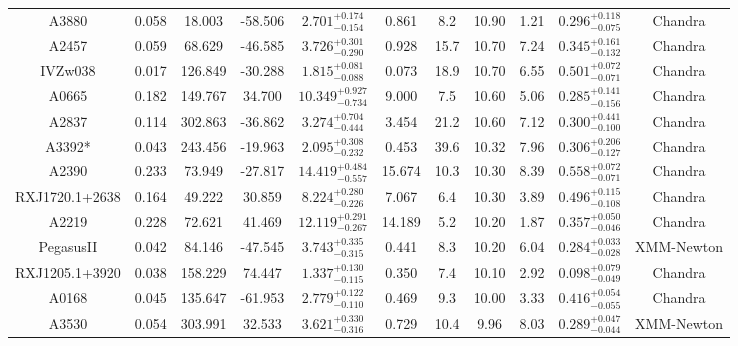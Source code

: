 \documentclass{aa}   %
\begin{document}
\begin{table}[h!]
\begin{center}
\begin{tabular}{ c  c  c  c c c c c c c c }
A3880               		&		0.058	&	18.003	&	-58.506	& $	2.701^{+0.174}_{-0.154}$  &      0.861	&  8.2	&	10.90	&	1.21	&	$ 0.296^{+0.118}_{-0.075}  $ &	  Chandra     \\
A2457               		&		0.059	&	68.629	&	-46.585	& $	3.726^{+0.301}_{-0.290}$  &      0.928	&  15.7	&	10.70	&	7.24	&	$ 0.345^{+0.161}_{-0.132}  $ &	 Chandra      \\
IVZw038             		&		0.017	&	126.849	&	-30.288	& $	1.815^{+0.081}_{-0.088}$  &      0.073	&  18.9	&	10.70	&	6.55	&	$ 0.501^{+0.072}_{-0.071}  $ &	 Chandra      \\
A0665               		&		0.182	&	149.767	&	34.700	& $ 10.349^{+0.927}_{-0.734}$ &      9.000	&  7.5	&	10.60	&	5.06	&	$ 0.285^{+0.141}_{-0.156}  $ &	  Chandra     \\
A2837               		&		0.114	&	302.863	&	-36.862	& $	3.274^{+0.704}_{-0.444}$  &      3.454	&  21.2	&	10.60	&	7.12	&	$ 0.300^{+0.441}_{-0.100}  $ &	 Chandra      \\
A3392*              		&		0.043	&	243.456	&	-19.963	& $	2.095^{+0.308}_{-0.232}$  &      0.453	&  39.6	&	10.32	&	7.96	&	$ 0.306^{+0.206}_{-0.127}  $ &	 Chandra      \\
A2390               		&		0.233	&	73.949	&	-27.817	& $ 14.419^{+0.484}_{-0.557}$ &     15.674	&  10.3	&	10.30	&	8.39	&	$ 0.558^{+0.072}_{-0.071}  $ &	 Chandra      \\
RXJ1720.1+2638      		&		0.164	&	49.222	&	30.859	& $	8.224^{+0.280}_{-0.226}$  &      7.067	&  6.4	&	10.30	&	3.89	&	$ 0.496^{+0.115}_{-0.108}  $ &	  Chandra     \\
A2219               		&		0.228	&	72.621	&	41.469	& $ 12.119^{+0.291}_{-0.267}$ &     14.189	&  5.2	&	10.20	&	1.87	&	$ 0.357^{+0.050}_{-0.046}  $ &	  Chandra     \\
PegasusII           		&		0.042	&	84.146	&	-47.545	& $	3.743^{+0.335}_{-0.315}$  &      0.441	&  8.3	&	10.20	&	6.04	&	$ 0.284^{+0.033}_{-0.028}  $ &	 XMM-Newton   \\
RXJ1205.1+3920      		&		0.038	&	158.229	&	74.447	& $	1.337^{+0.130}_{-0.115}$  &      0.350	&  7.4	&	10.10	&	2.92	&	$ 0.098^{+0.079}_{-0.049}  $ &	  Chandra     \\
A0168               		&		0.045	&	135.647	&	-61.953	& $	2.779^{+0.122}_{-0.110}$  &      0.469	&  9.3	&	10.00	&	3.33	&	$ 0.416^{+0.054}_{-0.055}  $ &	  Chandra     \\
A3530               		&		0.054	&	303.991	&	32.533	& $	3.621^{+0.330}_{-0.316}$  &      0.729	&  10.4	&	9.96	&	8.03	&	$ 0.289^{+0.047}_{-0.044}  $ &	 XMM-Newton   \\

\end{tabular}
\end{center}
\end{table}
\end{document}
